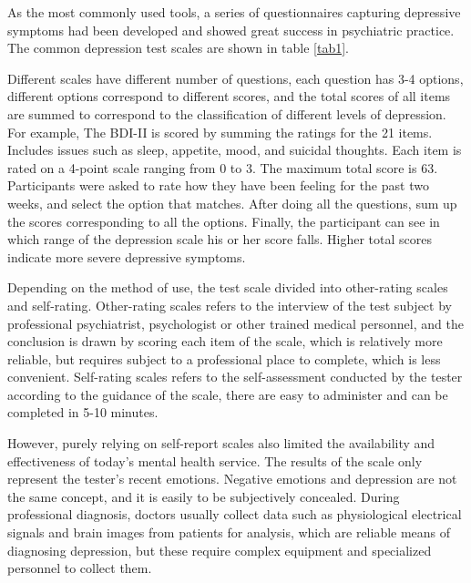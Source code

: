 As the most commonly used tools, a series of questionnaires capturing depressive symptoms had been developed and showed great success in psychiatric practice.
The common depression test scales are shown in table \ref{tab1}.

Different scales have different number of questions, each question has 3-4 options, different options correspond to different scores, and the total scores of all items are summed to correspond to the classification of different levels of depression. 
For example,
The BDI-II is scored by summing the ratings for the 21 items. Includes issues such as sleep, appetite, mood, and suicidal thoughts. Each item is rated on a 4-point scale ranging from 0 to 3. The maximum total score is 63. Participants were asked to rate how they have been feeling for the past two weeks, and select the option that matches. After doing all the questions, sum up the scores corresponding to all the options. Finally, the participant can see in which range of the depression scale his or her score falls. Higher total scores indicate more severe depressive symptoms.

Depending on the method of use, the test scale divided into other-rating scales and self-rating.
Other-rating scales refers to the interview of the test subject by professional psychiatrist, psychologist or other trained medical personnel, and the conclusion is drawn by scoring each item of the scale, which is relatively more reliable, but requires subject to a professional place to complete, which is less convenient.
Self-rating scales refers to the self-assessment conducted by the tester according to the guidance of the scale, there are easy to administer and can be completed in 5-10 minutes.
 


However, purely relying on self-report scales also limited the availability and effectiveness of today’s mental health service. The results of the scale only represent the tester's recent emotions. Negative emotions and depression are not the same concept, and it is easily to be subjectively concealed. 
During professional diagnosis, doctors usually collect data such as physiological electrical signals and brain images from patients for analysis, which are reliable means of diagnosing depression, but these require complex equipment and specialized personnel to collect them.

